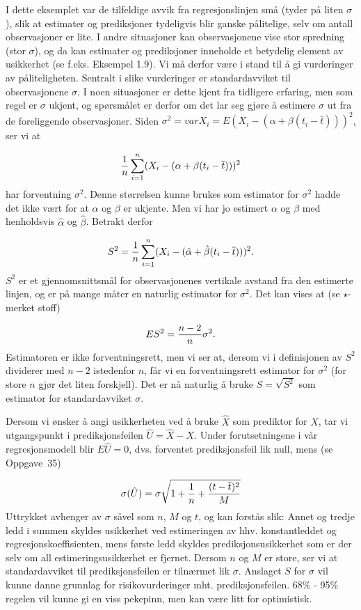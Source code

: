 I dette eksemplet var de tilfeldige avvik fra regresjonslinjen
små (tyder på liten $\sigma$), slik at estimater og
prediksjoner tydeligvis blir ganske pålitelige, selv om
antall observasjoner er lite. I andre situasjoner kan
observasjonene vise stor spredning (stor $\sigma$), og da kan
estimater og prediksjoner inneholde et betydelig element av
usikkerhet (se f.eks. Eksempel 1.9). Vi må derfor være i
stand til å gi vurderinger av påliteligheten. Sentralt i
slike vurderinger er standardavviket til observasjonene $\sigma$.
I noen situasjoner er dette kjent fra tidligere erfaring, men som
regel er $\sigma$ ukjent, og spørsmålet er derfor om det
lar seg gjøre å estimere $\sigma$ ut fra de foreliggende
observasjoner. Siden $\sigma ^2=varX_i=E(X_i-(\alpha + \beta (t_i -
\bar t)))^2$, ser vi at 

\[ {1\over n} \sum_{i=1}^n(X_i - (\alpha + \beta (t_i - \bar t)))^2\]
har forventning $\sigma ^2$. Denne størrelsen kunne brukes som
estimator for $\sigma ^2$ hadde det ikke vært for at $\alpha$
og $\beta$ er ukjente. Men vi har jo estimert $\alpha$ og $\beta$
med henholdsvis $\hat\alpha$ og $\hat\beta$. Betrakt derfor

\[ S^2={1\over n }\sum_{i=1}^n(X_i - (\hat{\alpha} +
                          \hat{\beta}(t_i - \bar t)))^2.\]
$S^2$ er et gjennomsnittsmål for observasjonenes vertikale
avstand fra den estimerte linjen, og er på mange måter en
naturlig estimator for $\sigma ^2$. Det kan vises at (se $\star$-merket
stoff)

\[ ES^2={n-2\over n}\sigma ^2.\]
Estimatoren er ikke forventningsrett, men vi ser at, dersom vi i
definisjonen av $S^2$ dividerer med $n-2$ istedenfor $n$, får vi
en forventningsrett estimator for $\sigma ^2$ (for store $n$
gjør det liten forskjell). Det er nå naturlig å bruke
$S=\sqrt{S^2}$ som estimator for standardavviket $\sigma$.
 
Dersom vi ønsker å angi usikkerheten ved å bruke $\hat
X$ som prediktor for $X$, tar vi utgangspunkt i prediksjonsfeilen
$\hat U=\hat X- X$. Under forutsetningene i vår regresjonsmodell
blir $E\hat U=0$, dvs. forventet prediksjonsfeil lik null, mens (se
Oppgave~35)

\[ \sigma (\hat U)=\sigma \sqrt{1+{1\over n}+{(t-\bar t)^2\over M}}\]
Uttrykket avhenger av $\sigma$ såvel som $n$, $M$ og $t$, og kan
forstås slik: Annet og tredje ledd i summen skyldes usikkerhet ved
estimeringen av hhv. konstantleddet og regresjonskoeffisienten, mens første
ledd skyldes prediksjonsusikkerhet som er der selv om all estimeringsusikkerhet
er fjernet. Dersom $n$ og $M$ er store, ser vi at standardavviket til
prediksjonsfeilen er tilnærmet lik $\sigma$. Anslaget $S$ for
$\sigma$ vil kunne danne grunnlag for risikovurderinger mht.
prediksjonsfeilen. 68\% - 95\% regelen vil kunne gi en viss
pekepinn, men kan være litt for optimistisk.

